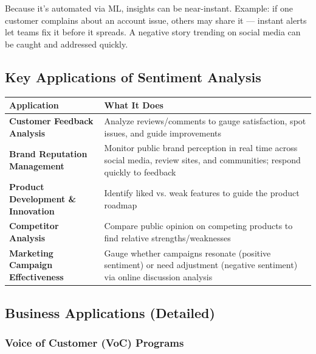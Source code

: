 \documentclass[12pt,openany]{book}
\begin{document}
Because it's automated via ML, insights can be near-instant. Example: if one customer complains about an account issue, others may share it --- instant alerts let teams fix it before it spreads. A negative story trending on social media can be caught and addressed quickly.

\subsection{Key Applications of Sentiment Analysis}

\begin{center}
\begin{tabular}{|L{0.30\textwidth}|L{0.60\textwidth}|}
\hline
Application & What It Does \\
\hline
\textbf{Customer Feedback Analysis} & Analyze reviews/comments to gauge satisfaction, spot issues, and guide improvements \\
\hline
\textbf{Brand Reputation Management} & Monitor public brand perception in real time across social media, review sites, and communities; respond quickly to feedback \\
\hline
\textbf{Product Development \& Innovation} & Identify liked vs. weak features to guide the product roadmap \\
\hline
\textbf{Competitor Analysis} & Compare public opinion on competing products to find relative strengths/weaknesses \\
\hline
\textbf{Marketing Campaign Effectiveness} & Gauge whether campaigns resonate (positive sentiment) or need adjustment (negative sentiment) via online discussion analysis \\
\hline
\end{tabular}
\end{center}

\subsection{Business Applications (Detailed)}

\subsubsection{Voice of Customer (VoC) Programs}
\end{document}
